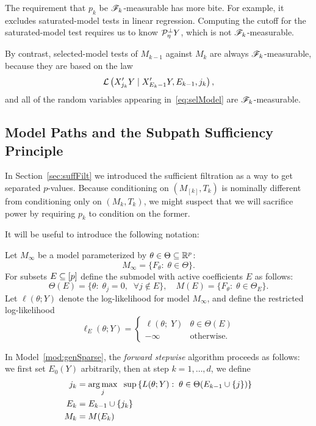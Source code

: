 \documentclass{article}
\begin{document}
The requirement that $p_k$ be $\mathscr{F}_k$-measurable has more bite. For example, it excludes saturated-model tests in linear regression. Computing the cutoff for the saturated-model test requires us to know $\mathcal{P}_{\eta}^\perp Y$, which is not $\mathscr{F}_k$-measurable.

By contrast, selected-model tests of $M_{k-1}$ against $M_k$ are always $\mathscr{F}_k$-measurable, because they are based on the law
\begin{equation}\label{eq:selModel}
\mathcal{L}\left(X_{j_k}'Y \mid X_{E_k-1}'Y, E_{k-1}, j_k\right),
\end{equation}
and all of the random variables appearing in~\eqref{eq:selModel} are $\mathscr{F}_k$-measurable.

\subsection{Model Paths and the Subpath Sufficiency Principle}\label{sec:modelSSP}

In Section~\ref{sec:suffFilt} we introduced the sufficient filtration as a way to get separated $p$-values. Because conditioning on $(M_{[k]}, T_k)$ is nominally different from conditioning only on $(M_k, T_k)$, we might suspect that we will sacrifice power by requiring $p_k$ to condition on the former.

It will be useful to introduce the following notation:

\begin{model}\label{mod:genSparse}
  Let $M_\infty$ be a model parameterized by $\theta\in \Theta \subseteq \mathbb{R}^p$:
  \[
  M_\infty = \{F_\theta:\; \theta \in \Theta\}.
  \]
  For subsets $E\subseteq [p]$ define the submodel with active coefficients $E$ as follows:
  \[
  \Theta(E) = \{\theta:\; \theta_j = 0, \;\;\forall j \notin E\}, 
  \quad M(E) = \{F_\theta:\; \theta\in \Theta_E\}.
  \]
  Let $\ell(\theta; Y)$ denote the log-likelihood for model
  $M_\infty$, and define the restricted log-likelihood
  \[
  \ell_E(\theta; Y) = \left\{\begin{matrix} \ell(\theta; \;Y) 
      & \theta \in \Theta(E)\\ -\infty  & 
      \mathrm{ otherwise.}\end{matrix}\right. 
  \]
\end{model}

In Model~\ref{mod:genSparse}, the {\em forward stepwise} algorithm proceeds as follows: we first set $E_0(Y)$ arbitrarily, then at step $k=1,\ldots,d$, we define
\begin{align}\label{eq:forwardDef_start}
j_k &= \operatorname*{arg\,max}_j \;\;\sup \left\{L(\theta; Y):\; \theta\in\Theta(E_{k-1} \cup \{j\})\right\} \\
E_k &= E_{k-1} \cup \{j_k\}\\\label{eq:forwardDef_end}
M_k &= M(E_k)
\end{align}
\end{document}
